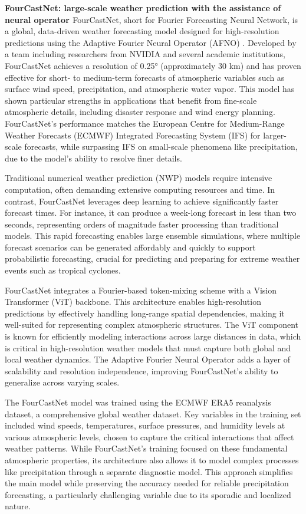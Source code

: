 \textbf{FourCastNet: large-scale weather prediction with the assistance of neural operator \cite{pathak2022fourcastnet}}
FourCastNet, short for Fourier Forecasting Neural Network, is a global, data-driven weather forecasting model designed for high-resolution predictions using the Adaptive Fourier Neural Operator (AFNO) \cite{guibas2021adaptive}. Developed by a team including researchers from NVIDIA and several academic institutions, FourCastNet achieves a resolution of 0.25° (approximately 30 km) and has proven effective for short- to medium-term forecasts of atmospheric variables such as surface wind speed, precipitation, and atmospheric water vapor. This model has shown particular strengths in applications that benefit from fine-scale atmospheric details, including disaster response and wind energy planning. FourCastNet’s performance matches the European Centre for Medium-Range Weather Forecasts (ECMWF) Integrated Forecasting System (IFS) for larger-scale forecasts, while surpassing IFS on small-scale phenomena like precipitation, due to the model's ability to resolve finer details.

Traditional numerical weather prediction (NWP) models require intensive computation, often demanding extensive computing resources and time. In contrast, FourCastNet leverages deep learning to achieve significantly faster forecast times. For instance, it can produce a week-long forecast in less than two seconds, representing orders of magnitude faster processing than traditional models. This rapid forecasting enables large ensemble simulations, where multiple forecast scenarios can be generated affordably and quickly to support probabilistic forecasting, crucial for predicting and preparing for extreme weather events such as tropical cyclones.

FourCastNet integrates a Fourier-based token-mixing scheme with a Vision Transformer (ViT) \cite{dosovitskiy2020image} backbone. This architecture enables high-resolution predictions by effectively handling long-range spatial dependencies, making it well-suited for representing complex atmospheric structures. The ViT component is known for efficiently modeling interactions across large distances in data, which is critical in high-resolution weather models that must capture both global and local weather dynamics. The Adaptive Fourier Neural Operator adds a layer of scalability and resolution independence, improving FourCastNet’s ability to generalize across varying scales.

The FourCastNet model was trained using the ECMWF ERA5 reanalysis dataset, a comprehensive global weather dataset. Key variables in the training set included wind speeds, temperatures, surface pressures, and humidity levels at various atmospheric levels, chosen to capture the critical interactions that affect weather patterns. While FourCastNet’s training focused on these fundamental atmospheric properties, its architecture also allows it to model complex processes like precipitation through a separate diagnostic model. This approach simplifies the main model while preserving the accuracy needed for reliable precipitation forecasting, a particularly challenging variable due to its sporadic and localized nature.

